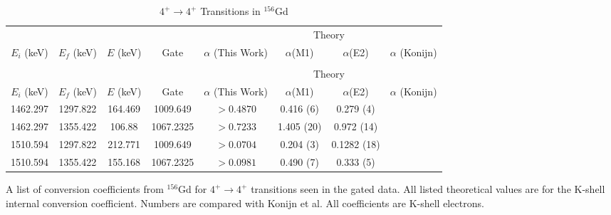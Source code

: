 \begin{landscape}
    \begin{longtable}{c|c|c|c|c|c|c|c}
        \caption{$4^+\rightarrow 4^+$ Transitions in $^{156}$Gd}
        \label{tab:156Gd_4_to_4}\\
        \toprule
        &	& 	&  &	& \multicolumn{2}{c}{Theory}	& 	\\
        $E_i$ (keV)	&	$E_f$ (keV)	& $E$ (keV)	&	Gate &		$\alpha$ (This Work)	& $\alpha$(M1) & $\alpha$(E2) &	$\alpha$ (Konijn)	\\
        \hline
        \endfirsthead
        \toprule
        \caption[]{$4^+\rightarrow 4^+$ Transitions in $^{156}$Gd}\\
        &	& 	&  &	& \multicolumn{2}{c}{Theory}	& 	\\
        $E_i$ (keV)	&	$E_f$ (keV)	& $E$ (keV)	&	Gate &		$\alpha$ (This Work)	& $\alpha$(M1) & $\alpha$(E2) &	$\alpha$ (Konijn)	\\
        \hline
	    \endhead
        1462.297 & 1297.822 & 164.469 & 1009.649 & $>0.4870$ & 0.416 (6) & 0.279 (4) & \\ \hline
        1462.297 & 1355.422 & 106.88 & 1067.2325 & $>0.7233$ & 1.405 (20) & 0.972 (14) & \\ \hline
        1510.594 & 1297.822 & 212.771 & 1009.649 & $>0.0704$  & 0.204 (3) & 0.1282 (18) & \\ \hline
        1510.594 & 1355.422 & 155.168 & 1067.2325 & $>0.0981$ & 0.490 (7) & 0.333 (5) &  \\
        \bottomrule
    \end{longtable}
    \caption{A list of conversion coefficients from $^{156}$Gd for $4^+\rightarrow 4^+$ transitions seen in the gated data. All listed theoretical values are for the K-shell internal conversion coefficient. Numbers are compared with Konijn et al. \citep{konjin81:_156gd} All coefficients are K-shell electrons.}
\end{landscape} 